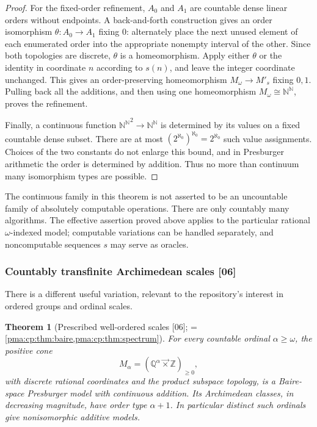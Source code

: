 \documentclass[11pt]{article}
\numberwithin{equation}{section}
\newtheorem{theorem}{Theorem}[section]
\theoremstyle{definition}
\theoremstyle{remark}
\newcommand{\N}{\mathbb N}
\newcommand{\Z}{\mathbb Z}
\newcommand{\Q}{\mathbb Q}
\newcommand{\Baire}{\N^{\N}}
\newcommand{\lex}{\mathbin{\overrightarrow\times}}
\newcommand{\src}[1]{\textup{\textsf{\small[#1]}}}
\begin{document}
\begin{proof}
For the fixed-order refinement, $A_0$ and $A_1$ are countable dense
linear orders without endpoints. A back-and-forth construction gives
an order isomorphism $\theta:A_0\to A_1$ fixing $0$: alternately place
the next unused element of each enumerated order into the appropriate
nonempty interval of the other. Since both topologies are discrete,
$\theta$ is a homeomorphism. Apply either $\theta$ or the identity in
coordinate $n$ according to $s(n)$, and leave the integer coordinate
unchanged. This gives an order-preserving homeomorphism
$M_\omega\to M'_s$ fixing $0,1$. Pulling back all the additions, and then
using one homeomorphism $M_\omega\cong\Baire$, proves the refinement.

Finally, a continuous function ${\Baire}^2\to\Baire$ is determined by its
values on a fixed countable dense subset. There are at most
$(2^{\aleph_0})^{\aleph_0}=2^{\aleph_0}$ such value assignments. Choices
of the two constants do not enlarge this bound, and in Presburger
arithmetic the order is determined by addition. Thus no more than
continuum many isomorphism types are possible.
\end{proof}

The continuous family in this theorem is not asserted to be an
uncountable family of absolutely computable operations. There are only
countably many algorithms. The effective assertion proved above applies
to the particular rational $\omega$-indexed model; computable variations
can be handled separately, and noncomputable sequences $s$ may serve as
oracles.

\subsubsection{Countably transfinite Archimedean scales \src{06}}

There is a different useful variation, relevant to the repository's
interest in ordered groups and ordinal scales.

\begin{theorem}[Prescribed well-ordered scales \src{06}; = \cref{pma:cp:thm:baire,pma:cp:thm:spectrum}]
\label{pma:cp:thm:ordinals}
For every countable ordinal $\alpha\geq\omega$, the positive cone
\[
 M_\alpha=(\Q^\alpha\lex\Z)_{\geq0},
\]
with discrete rational coordinates and the product subspace topology,
is a Baire-space Presburger model with continuous addition. Its
Archimedean classes, in decreasing magnitude, have order type
$\alpha+1$. In particular distinct such ordinals give nonisomorphic
additive models.
\end{theorem}
\end{document}
